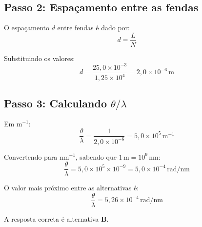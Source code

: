 \begin{flushleft}
\subsection*{Passo 2: Espaçamento entre as fendas}

O espaçamento \(d\) entre fendas é dado por:
\[
d = \frac{L}{N}
\]

Substituindo os valores:
\[
d = \frac{25{,}0 \times 10^{-3}}{1{,}25 \times 10^4} = 2{,}0 \times 10^{-6}\,\mathrm{m}
\]

\subsection*{Passo 3: Calculando \( \theta/\lambda \)}

Em \(\mathrm{m}^{-1}\):
\[
\frac{\theta}{\lambda} = \frac{1}{2{,}0 \times 10^{-6}} = 5{,}0 \times 10^{5}\,\mathrm{m}^{-1}
\]

Convertendo para \(\mathrm{nm}^{-1}\), sabendo que \(1\,\mathrm{m} = 10^{9}\,\mathrm{nm}\):
\[
\frac{\theta}{\lambda} = 5{,}0 \times 10^{5} \times 10^{-9} = 5{,}0 \times 10^{-4}\,\mathrm{rad/nm}
\]

O valor mais próximo entre as alternativas é:
\[
\boxed{\frac{\theta}{\lambda} = 5{,}26 \times 10^{-4}\,\mathrm{rad/nm}}
\]


A resposta correta é alternativa \colorbox{green!50}{\textbf{B}}.
\end{flushleft}

